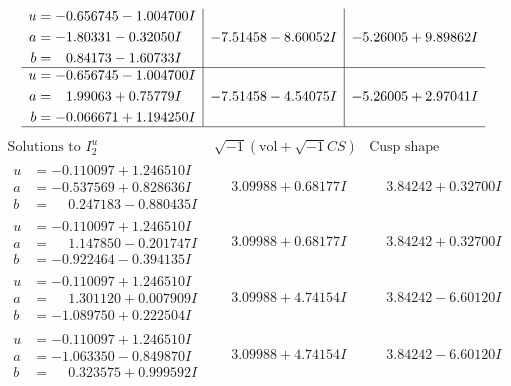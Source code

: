 \documentclass[1p]{elsarticle_modified}
\theoremstyle{definition}
\newcommand{\I}{\sqrt{-1}}
\begin{document}
$$\begin{array}{c|c|c}
\begin{aligned}
u &= -0.656745 - 1.004700 I \\
a &= -1.80331 - 0.32050 I \\
b &= \phantom{-}0.84173 - 1.60733 I\end{aligned}
 & -7.51458 - 8.60052 I & -5.26005 + 9.89862 I \\ \hline\begin{aligned}
u &= -0.656745 - 1.004700 I \\
a &= \phantom{-}1.99063 + 0.75779 I \\
b &= -0.066671 + 1.194250 I\end{aligned}
 & -7.51458 - 4.54075 I & -5.26005 + 2.97041 I\\
 \hline 
 \end{array}$$\newpage$$\begin{array}{c|c|c}  
\text{Solutions to }I^u_{2}& \I (\text{vol} + \sqrt{-1}CS) & \text{Cusp shape}\\
 \hline 
\begin{aligned}
u &= -0.110097 + 1.246510 I \\
a &= -0.537569 + 0.828636 I \\
b &= \phantom{-}0.247183 - 0.880435 I\end{aligned}
 & \phantom{-}3.09988 + 0.68177 I & \phantom{-}3.84242 + 0.32700 I \\ \hline\begin{aligned}
u &= -0.110097 + 1.246510 I \\
a &= \phantom{-}1.147850 - 0.201747 I \\
b &= -0.922464 - 0.394135 I\end{aligned}
 & \phantom{-}3.09988 + 0.68177 I & \phantom{-}3.84242 + 0.32700 I \\ \hline\begin{aligned}
u &= -0.110097 + 1.246510 I \\
a &= \phantom{-}1.301120 + 0.007909 I \\
b &= -1.089750 + 0.222504 I\end{aligned}
 & \phantom{-}3.09988 + 4.74154 I & \phantom{-}3.84242 - 6.60120 I \\ \hline\begin{aligned}
u &= -0.110097 + 1.246510 I \\
a &= -1.063350 - 0.849870 I \\
b &= \phantom{-}0.323575 + 0.999592 I\end{aligned}
 & \phantom{-}3.09988 + 4.74154 I & \phantom{-}3.84242 - 6.60120 I \\ \hline\begin{aligned}

\end{aligned}
\end{array}$$
\end{document}

